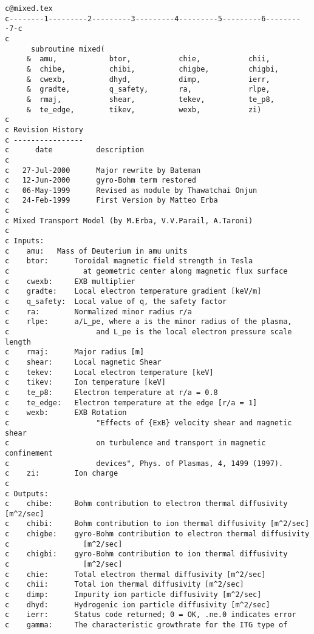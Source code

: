 \documentclass{article}    %
\begin{document}
\begin{verbatim}
c@mixed.tex
c--------1---------2---------3---------4---------5---------6---------7-c
c
      subroutine mixed(
     &  amu,            btor,           chie,           chii,
     &  chibe,          chibi,          chigbe,         chigbi,
     &  cwexb,          dhyd,           dimp,           ierr,		
     &  gradte,         q_safety,       ra,             rlpe,		
     &  rmaj,           shear,          tekev,          te_p8,          
     &  te_edge,        tikev,          wexb,           zi)		
c
c Revision History
c ----------------
c      date          description
c
c   27-Jul-2000      Major rewrite by Bateman
c   12-Jun-2000      gyro-Bohm term restored
c   06-May-1999      Revised as module by Thawatchai Onjun
c   24-Feb-1999      First Version by Matteo Erba
c
c Mixed Transport Model (by M.Erba, V.V.Parail, A.Taroni)
c
c Inputs:
c    amu:	Mass of Deuterium in amu units
c    btor:      Toroidal magnetic field strength in Tesla
c                 at geometric center along magnetic flux surface
c    cwexb:     EXB multiplier
c    gradte:    Local electron temperature gradient [keV/m]
c    q_safety:  Local value of q, the safety factor
c    ra:       	Normalized minor radius r/a
c    rlpe:     	a/L_pe, where a is the minor radius of the plasma,
c                    and L_pe is the local electron pressure scale length
c    rmaj:      Major radius [m]	
c    shear:     Local magnetic Shear
c    tekev:     Local electron temperature [keV]
c    tikev:     Ion temperature [keV]
c    te_p8:     Electron temperature at r/a = 0.8
c    te_edge:   Electron temperature at the edge [r/a = 1]
c    wexb:      EXB Rotation
c                    "Effects of {ExB} velocity shear and magnetic shear 
c                    on turbulence and transport in magnetic confinement 
c                    devices", Phys. of Plasmas, 4, 1499 (1997).
c    zi:        Ion charge
c
c Outputs:
c    chibe:     Bohm contribution to electron thermal diffusivity [m^2/sec]
c    chibi:     Bohm contribution to ion thermal diffusivity [m^2/sec]
c    chigbe:    gyro-Bohm contribution to electron thermal diffusivity
c                 [m^2/sec]
c    chigbi:    gyro-Bohm contribution to ion thermal diffusivity
c                 [m^2/sec]
c    chie:      Total electron thermal diffusivity [m^2/sec]
c    chii:      Total ion thermal diffusivity [m^2/sec]
c    dimp:      Impurity ion particle diffusivity [m^2/sec]
c    dhyd:      Hydrogenic ion particle diffusivity [m^2/sec]
c    ierr:      Status code returned; 0 = OK, .ne.0 indicates error
c    gamma:     The characteristic growthrate for the ITG type of 

\end{verbatim}
\end{document}
